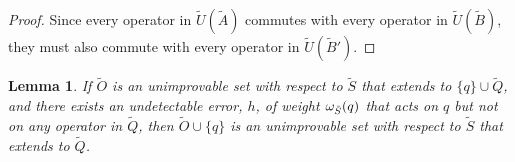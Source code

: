 \documentclass[twocolumn,showpacs,preprintnumbers,amsmath,amssymb,nofootinbib,pra,floatfix]{revtex4-1}
\newtheorem{lemma}{Lemma}
\newcommand{\set}{\tilde}
\begin{document}
\begin{proof}
Since every operator in $\set U(\set A)$ commutes with every operator in $\set U(\set B)$, they must also commute with every operator in $\set U(\set B')$.
\end{proof}
\begin{lemma}
\label{move-it-over}
If $\set O$ is an unimprovable set with respect to $\set S$ that extends to $\{q\}\cup\set Q$, and there exists an undetectable error, $h$, of weight $\om_{\set S}(q)$ that acts on $q$ but not on any operator in $\set Q$, then $\set O\cup\{q\}$ is an unimprovable set with respect to $\set S$ that extends to $\set Q$.
\end{lemma}
\end{document}
